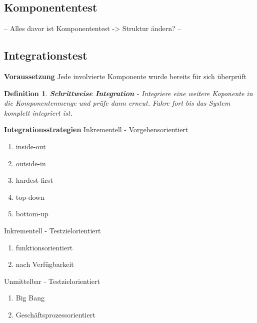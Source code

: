 \documentclass[a4paper]{article}
\theoremstyle{break}
\newtheorem{defi}{Definition}[section]
\begin{document}
          \subsection{Komponententest}
          -- Alles davor ist Komponententest -> Struktur ändern? --
          \subsection{Integrationstest}
          \textbf{Voraussetzung}
          Jede involvierte Komponente wurde bereits für sich überprüft

          \begin{defi}
            \textbf{Schrittweise Integration} - Integriere eine weitere Koponente in die Komponentenmenge und prüfe dann erneut. Fahre fort bis das System komplett integriert ist.
          \end{defi}
          
          \begin{flushleft}
          \textbf{Integrationsstrategien} \newline
            Inkrementell - Vorgehensorientiert
          \end{flushleft}
          \begin{enumerate}
          \item inside-out
          \item outside-in
          \item hardest-first
          \item top-down
          \item bottom-up
          \end{enumerate}

          \begin{flushleft}
            Inkrementell - Testzielorientiert
          \end{flushleft}
          \begin{enumerate}
          \item funktionsorientiert
          \item nach Verfügbarkeit
          \end{enumerate}

          \begin{flushleft}
           Unmittelbar - Testzielorientiert
          \end{flushleft}
          \begin{enumerate}
          \item Big Bang
          \item Geschäftsprozessorientiert
          \end{enumerate}
\end{document}
